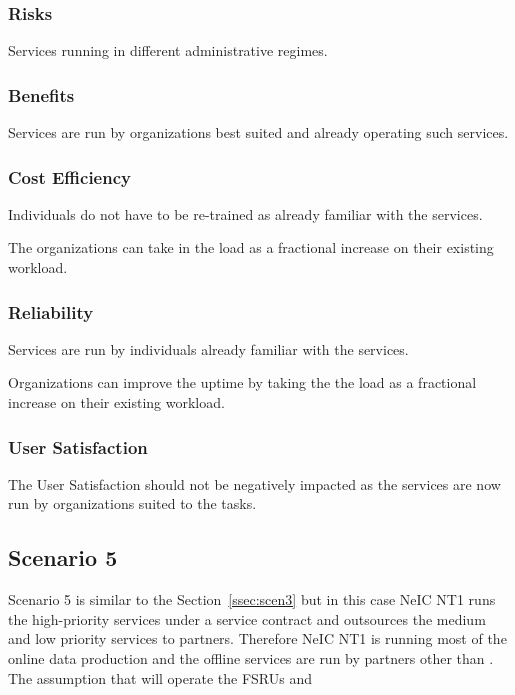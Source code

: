 \documentclass[12pt,a4paper]{article}
\begin{document}
\subsubsection*{Risks}
\bitm
\item Services running in different administrative regimes.
\eitm

\subsubsection*{Benefits}
\bitm
\item Services are run by organizations best suited and already operating such services.
\eitm

\subsubsection*{Cost Efficiency}
\bitm
\item Individuals do not have to be re-trained as already familiar with the services.
\item The organizations can take in the \ED load as a fractional increase on their existing workload.
\eitm

\subsubsection*{Reliability}
\bitm
\item Services are run by individuals already familiar with the services.
\item Organizations can improve the uptime by taking the the \ED load as a fractional increase on their existing workload.
\eitm

\subsubsection*{User Satisfaction}
\bitm
\item The User Satisfaction should not be negatively impacted as the services are now run by organizations suited to the tasks.
\eitm
  
\subsection{Scenario 5}
\label{ssec:scen5}

Scenario 5 is similar to the Section~\ref{ssec:scen3} but in this case
NeIC NT1 runs the high-priority services under a service contract and \EC outsources the medium and low priority services to partners.
Therefore NeIC NT1 is running most of the online data production and the offline services are run by partners other than \EC.
The assumption that \EC will operate the FSRUs and 
\end{document}
